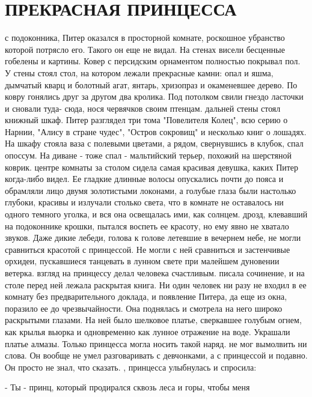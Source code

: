 \chapter{ПРЕКРАСНАЯ ПРИНЦЕССА}
\par{} с подоконника, Питер оказался в просторной комнате, 
роскошное убранство которой потрясло его. Такого он еще не видал. На 
стенах висели бесценные гобелены и картины. Ковер с персидским 
орнаментом полностью покрывал пол. У стены стоял стол, на котором 
лежали прекрасные камни: опал и яшма, дымчатый кварц и болотный агат, 
янтарь, хризопраз и окаменевшее дерево. По ковру гонялись друг за 
другом два кролика. Под потолком свили гнездо ласточки и сновали туда-
сюда, нося червячков своим птенцам.
 дальней стены стоял книжный шкаф. Питер разглядел три тома 
"Повелителя Колец", всю серию о Нарнии, "Алису в стране чудес", 
"Остров сокровищ" и несколько книг о лошадях. На шкафу стояла ваза с 
полевыми цветами, а рядом, свернувшись в клубок, спал опоссум. На 
диване - тоже спал - мальтийский терьер, похожий на шерстяной коврик.
 центре комнаты за столом сидела самая красивая девушка, каких 
Питер когда-либо видел. Ее гладкие длинные волосы опускались почти до 
пояса и обрамляли лицо двумя золотистыми локонами, а голубые глаза 
были настолько глубоки, красивы и излучали столько света, что в 
комнате не оставалось ни одного темного уголка, и вся она освещалась 
ими, как солнцем.
 дрозд, клевавший на подоконнике крошки, пытался воспеть ее 
красоту, но ему явно не хватало звуков. Даже дикие лебеди, голова к 
голове летевшие в вечернем небе, не могли сравниться красотой с 
принцессой. Не могли с ней сравниться и застенчивые орхидеи, 
пускавшиеся танцевать в лунном свете при малейшем дуновении ветерка.
 взгляд на принцессу делал человека счастливым.
 писала сочинение, и на столе перед ней лежала раскрытая 
книга. Ни один человек ни разу не входил в ее комнату без 
предварительного доклада, и появление Питера, да еще из окна, поразило 
ее до чрезвычайности. Она поднялась и смотрела на него широко 
раскрытыми глазами. На ней было шелковое платье, сверкавшее голубым 
огнем, как крылья вьюрка и одновременно как лунное отражение на воде. 
Украшали платье алмазы. Только принцесса могла носить такой наряд.
 не мог вымолвить ни слова. Он вообще не умел разговаривать с 
девчонками, а с принцессой и подавно. Он просто не знал, что сказать.
, принцесса улыбнулась и спросила:
\par- Ты - принц, который продирался сквозь леса и горы, чтобы меня 
